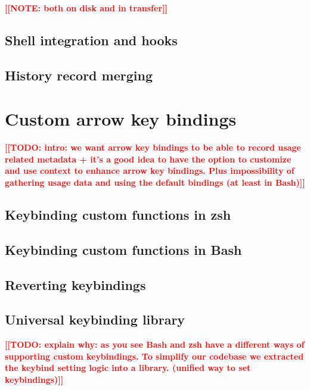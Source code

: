 \documentclass[thesis=M,english]{FITthesis}[2012/10/20]
\newcommand{\todotext}[1]{\textcolor{red}{\textbf{[[#1]]}}}
\newcommand{\blind}[1][1]{\textcolor{mygray}{\Blindtext[#1][1]}}
\begin{document}
\todotext{NOTE: both on disk and in transfer}

\blind

\subsection{Shell integration and hooks}

\blind

\subsection{History record merging}

\blind

\section{Custom arrow key bindings}

\todotext{TODO: intro: we want arrow key bindings to be able to record usage related metadata + it's a good idea to have the option to customize and use context to enhance arrow key bindings. Plus impossibility of gathering usage data and using the default bindings (at least in Bash)}

\blind

\subsection{Keybinding custom functions in zsh}

\blind

\subsection{Keybinding custom functions in Bash}

\blind

\subsection{Reverting keybindings}

\blind

\subsection{Universal keybinding library}
\todotext{TODO: explain why: as you see Bash and zsh have a different ways of supporting custom keybindings. To simplify our codebase we extracted the keybind setting logic into a library. (unified way to set keybindings)}
\end{document}
